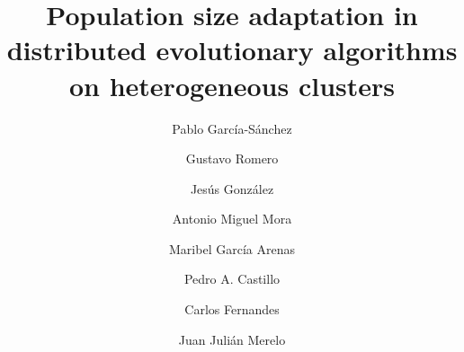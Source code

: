 \documentclass[final,1p,times]{elsarticle}
\begin{document}
\begin{frontmatter}



\title{Population size adaptation in distributed evolutionary algorithms on heterogeneous clusters}


\author[ugr]{Pablo Garc\'ia-S\'anchez}
\author[ugr]{Gustavo Romero}
\author[ugr]{Jes\'us Gonz\'alez}
\author[ugr]{Antonio Miguel Mora}
\author[ugr]{Maribel Garc\'ia Arenas}
\author[ugr]{Pedro A. Castillo}
\author[laseeb]{Carlos Fernandes}
\author[ugr]{Juan Juli\'an Merelo}


\address[ugr]{Department of Computer Architecture and Computer Technology and CITIC-UGR, University of Granada, Granada, Spain. Tel: +34958241778. Fax: +34958248993}
\address[laseeb]{LaSEEB-ISR-IST, Technical University of Lisbon (IST), Lisbon, Portugal}%



\end{frontmatter}
\end{document}
